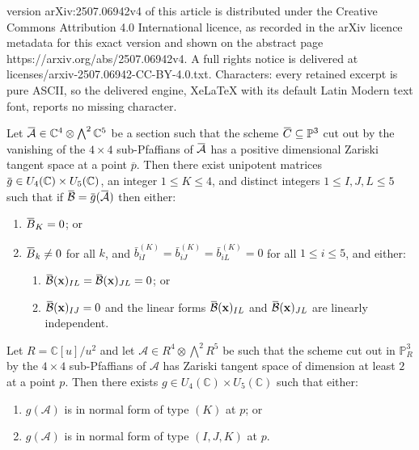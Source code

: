 \documentclass[10pt,a4paper]{amsart}
\newcommand{\CC}{\mathbb{C}}
\newcommand{\I}{I}
\newcommand{\J}{J}
\newcommand{\K}{K}
\newcommand{\PP}{\mathbb{P}}
\newcommand{\cA}{\mathcal{A}}
\newcommand{\cB}{\mathcal{B}}
\newcommand{\overbar}[1]{\mkern 1.5mu\overline{\mkern-1.5mu#1\mkern-1.5mu}\mkern 1.5mu}
\renewcommand{\L}{L}
\renewcommand{\subset}{\subseteq}
\begin{document}
version arXiv:2507.06942v4 of this article is distributed under the Creative Commons Attribution 4.0 International licence, as recorded in the arXiv licence metadata for this exact version and shown on the abstract page https://arxiv.org/abs/2507.06942v4. A full rights notice is delivered at licenses/arxiv-2507.06942-CC-BY-4.0.txt. Characters: every retained excerpt is pure ASCII, so the delivered engine, XeLaTeX with its default Latin Modern text font, reports no missing character.
\begin{lemma}
    \label{lemma:normal-form-5-CC}
       Let $\overbar{\cA} \in \CC^4 \otimes \bigwedge^2 \CC^5$ be a section such that the scheme $\overbar{C} \subset \PP^3$ cut out by the vanishing of the $4 \times 4$ sub-Pfaffians of $\overbar{\cA}$ has a positive dimensional Zariski tangent space at a point $\overline{p}$. Then there exist unipotent matrices $\overbar{g} \in U_4(\CC) \times U_5(\CC)$, an integer $1 \leq \K \leq 4$, and distinct integers $1 \leq \I,\J,\L \leq 5$ such that if $\overbar \cB = \overbar{g}(\overbar \cA)$ then either:
       \begin{enumerate}[label=(\Alph*)]
           \item \label{norm-form-CC-1} $\overbar{B}_\K = 0$; or
           \item \label{norm-form-CC-2} $\overbar{B}_{k} \neq 0$ for all $k$, and $\bar{b}_{i \I}^{(\K)} = \bar{b}_{i \J}^{(\K)} = \bar{b}_{i \L}^{(\K)} = 0$ for all $1 \leq i \leq 5$, and either:
             \begin{enumerate}[label=(\roman*)]
             \item \label{norm-form-CC-3}
               $\overbar{\mathcal{B}}(\mathbf{x})_{\I\L} = \overbar{\mathcal{B}}(\mathbf{x})_{\J\L} = 0$; or
             \item \label{norm-form-CC-4}
               $\overbar{\mathcal{B}}(\mathbf{x})_{\I\J} = 0$ and the linear forms $\overbar{\mathcal{B}}(\mathbf{x})_{\I\L}$ and $\overbar{\mathcal{B}}(\mathbf{x})_{\J\L}$ are linearly independent.
             \end{enumerate}
        \end{enumerate}
\end{lemma}

\begin{lemma}
  \label{lemma:divisibility}
  Let $R = \CC[u]/u^2$ and let ${\cA} \in R^4 \otimes \bigwedge^2 R^5$ be such that the scheme cut out in $\PP^3_R$ by the $4 \times 4$ sub-Pfaffians of $\cA$ has Zariski tangent space of dimension at least $2$ at a point ${p}$. Then there exists $g \in U_4(\CC) \times U_5(\CC)$ such that either:
  \begin{enumerate}[label=(\Alph*)]
    \item $g(\cA)$ is in normal form of type $(\K)$ at $p$; or 
      \item $g (\cA)$ is in normal form of type $(\I, \J, \K)$ at $p$.
  \end{enumerate}
\end{lemma} 
\end{document}
